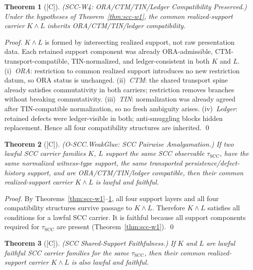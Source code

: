 \documentclass[12pt,oneside]{amsbook}
\theoremstyle{plain}
\newtheorem{theorem}{Theorem}[section]
\theoremstyle{definition}
\theoremstyle{remark}
\newcommand{\status}[1]{\textup{[#1]}}
\begin{document}
\begin{theorem}[\status{C}]\label{thm:scc-w4}
\textup{(SCC-W4: ORA/CTM/TIN/Ledger Compatibility Preserved.)}
Under the hypotheses of Theorem~\ref{thm:scc-w1}, the common
realized-support carrier $K \wedge L$ inherits ORA/CTM/TIN/ledger
compatibility.
\end{theorem}

\begin{proof}
$K \wedge L$ is formed by intersecting realized support, not raw
presentation data. Each retained support component was already
ORA-admissible, CTM-transport-compatible, TIN-normalized, and
ledger-consistent in both $K$ and $L$. (i)~\emph{ORA}: restriction
to common realized support introduces no new restriction datum, so
ORA status is unchanged. (ii)~\emph{CTM}: the shared transport
spine already satisfies commutativity in both carriers; restriction
removes branches without breaking commutativity. (iii)~\emph{TIN}:
normalization was already agreed after TIN-compatible normalization,
so no fresh ambiguity arises. (iv)~\emph{Ledger}: retained defects
were ledger-visible in both; anti-smuggling blocks hidden replacement.
Hence all four compatibility structures are inherited.
\qed
\end{proof}

\begin{theorem}[\status{C}]\label{thm:scc-weakglue}
\textup{(O-SCC.WeakGlue: SCC Pairwise Amalgamation.)}
If two lawful SCC carrier families $K$, $L$ support the same SCC
observable $\tau_{\mathrm{SCC}}$, have the same normalized witness-type
support, the same transported persistence/defect-history support, and
are ORA/CTM/TIN/ledger compatible, then their common realized-support
carrier $K \wedge L$ is lawful and faithful.
\end{theorem}

\begin{proof}
By Theorems~\ref{thm:scc-w1}--\ref{thm:scc-w4}, all four support
layers and all four compatibility structures survive passage to
$K \wedge L$. Therefore $K \wedge L$ satisfies all conditions for a
lawful SCC carrier. It is faithful because all support components
required for $\tau_{\mathrm{SCC}}$ are present (Theorem~\ref{thm:scc-w1}).
\qed
\end{proof}

\begin{theorem}[\status{C}]\label{thm:scc-ssf}
\textup{(SCC Shared-Support Faithfulness.)}
If $K$ and $L$ are lawful faithful SCC carrier families for the same
$\tau_{\mathrm{SCC}}$, then their common realized-support carrier
$K \wedge L$ is also lawful and faithful.
\end{theorem}
\end{document}
